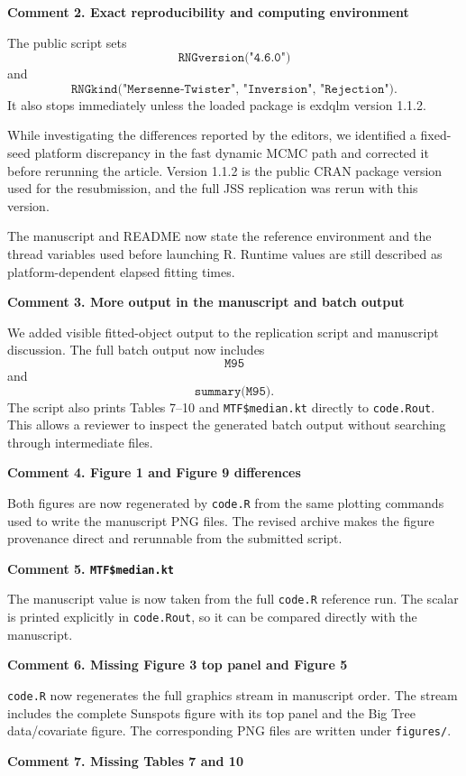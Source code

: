 \documentclass[11pt,letterpaper]{article}
\newcommand{\pkg}[1]{\textsf{#1}}
\newcommand{\proglang}[1]{\textsf{#1}}
\newcommand{\code}[1]{\texttt{#1}}
\newcommand{\commentheading}[1]{\vspace{8pt}\noindent\textbf{Comment #1}\par}
\begin{document}
\commentheading{2. Exact reproducibility and computing environment}

The public script sets
\[
\code{RNGversion("4.6.0")}
\]
and
\[
\code{RNGkind("Mersenne-Twister", "Inversion", "Rejection")}.
\]
It also stops immediately unless the loaded package is \pkg{exdqlm} version
1.1.2.

While investigating the differences reported by the editors, we identified a
fixed-seed platform discrepancy in the fast dynamic MCMC path and corrected it
before rerunning the article. Version 1.1.2 is the public CRAN package version
used for the resubmission, and the full JSS replication was rerun with this
version.

The manuscript and README now state the reference environment and the thread
variables used before launching \proglang{R}. Runtime values are still described
as platform-dependent elapsed fitting times.

\commentheading{3. More output in the manuscript and batch output}

We added visible fitted-object output to the replication script and manuscript
discussion. The full batch output now includes
\[
\code{M95}
\]
and
\[
\code{summary(M95)}.
\]
The script also prints Tables 7--10 and \code{MTF\$median.kt} directly to
\code{code.Rout}. This allows a reviewer to inspect the generated batch output
without searching through intermediate files.

\commentheading{4. Figure 1 and Figure 9 differences}

Both figures are now regenerated by \code{code.R} from the same plotting
commands used to write the manuscript PNG files. The revised archive makes the
figure provenance direct and rerunnable from the submitted script.

\commentheading{5. \code{MTF\$median.kt}}

The manuscript value is now taken from the full \code{code.R} reference run.
The scalar is printed explicitly in \code{code.Rout}, so it can be compared
directly with the manuscript.

\commentheading{6. Missing Figure 3 top panel and Figure 5}

\code{code.R} now regenerates the full graphics stream in manuscript order.
The stream includes the complete Sunspots figure with its top panel and the Big
Tree data/covariate figure. The corresponding PNG files are written under
\code{figures/}.

\commentheading{7. Missing Tables 7 and 10}
\end{document}
